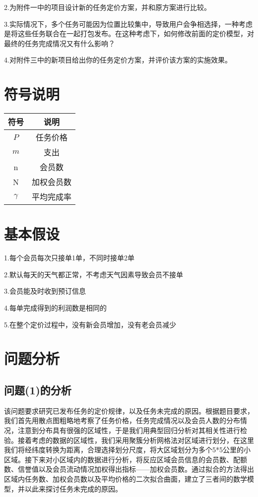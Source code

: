 \documentclass{ctexart}
\begin{document}
2.为附件一中的项目设计新的任务定价方案，并和原方案进行比较。

3.实际情况下，多个任务可能因为位置比较集中，导致用户会争相选择，一种考虑是将这些任务联合在一起打包发布。在这种考虑下，如何修改前面的定价模型，对最终的任务完成情况又有什么影响？

4.对附件三中的新项目给出你的任务定价方案，并评价该方案的实施效果。
\section{符号说明}
\begin{table}[htbp]\large
\centering
\begin{tabular}{|c|c|}
\hline
符号&说明\\
\hline
$P$&任务价格\\
\hline
$m$&支出\\
\hline
n&会员数\\
\hline
N&加权会员数\\
\hline
$\gamma$&平均完成率\\
\hline
\end{tabular}
\end{table}
\section{基本假设}
1.每个会员每次只接单1单，不同时接单2单

2.默认每天的天气都正常，不考虑天气因素导致会员不接单

3.会员能及时收到预订信息

4.每单完成得到的利润数是相同的

5.在整个定价过程中，没有新会员增加，没有老会员减少
\section{问题分析}
\subsection{问题(1)的分析}
该问题要求研究已发布任务的定价规律，以及任务未完成的原因。根据题目要求，我们首先用散点图粗略地考察了任务价格，任务完成情况以及会员人数的分布情况，注意到分布具有很强的区域性，于是我们用典型回归分析对其相关性进行检验。接着考虑的数据的区域性，我们采用聚簇分析网格法对区域进行划分，在这里我们将经纬度转换为距离，合理选择划分尺度，将大区域划分为多个5*5公里的小区域。接下来对小区域内的数据进行分析，将反应区域会员信息的会员数、配额数、信誉值以及会员流动情况加权得出指标——加权会员数。通过拟合的方法得出区域内任务数、加权会员数以及平均价格的二次拟合曲面，建立了三者间的数学模型，并以此来探讨任务未完成的原因。
\end{document}
